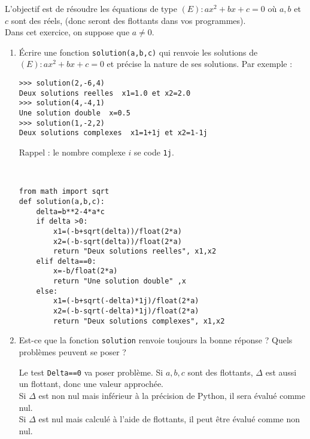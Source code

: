 L'objectif est de r\' esoudre les \' equations de type $(E)\colon ax^2+bx+c=0$ o\` u $a,b$ et $c$ sont des r\' eels, (donc seront des flottants dans vos programmes).\\
Dans cet exercice, on suppose que $a\neq 0$.
\begin{enumerate}
\item \' Ecrire une fonction \verb?solution(a,b,c)? qui renvoie les solutions de $(E)\colon ax^2+bx+c=0$ et pr\' ecise la nature de ses solutions. Par exemple :
\begin{verbatim}
>>> solution(2,-6,4)
Deux solutions reelles  x1=1.0 et x2=2.0
>>> solution(4,-4,1)
Une solution double  x=0.5
>>> solution(1,-2,2)
Deux solutions complexes  x1=1+1j et x2=1-1j
\end{verbatim}
Rappel : le nombre complexe $i$ se code \verb?1j?.

\begin{solution}~\\
\vspace*{-0.7cm}
\begin{verbatim}
from math import sqrt
def solution(a,b,c):
	delta=b**2-4*a*c
	if delta >0:
		x1=(-b+sqrt(delta))/float(2*a)
		x2=(-b-sqrt(delta))/float(2*a)
		return "Deux solutions reelles", x1,x2
	elif delta==0:
		x=-b/float(2*a)
		return "Une solution double" ,x
	else:
		x1=(-b+sqrt(-delta)*1j)/float(2*a)
		x2=(-b-sqrt(-delta)*1j)/float(2*a)
		return "Deux solutions complexes", x1,x2			
\end{verbatim}
\end{solution}
\item Est-ce que la fonction \verb?solution? renvoie toujours la bonne réponse ? Quels problèmes peuvent se poser ?
\begin{solution}
Le test \verb?Delta==0? va poser problème. Si $a,b,c$ sont des flottants, $\Delta$ est aussi un flottant, donc une valeur approchée.\\
Si $\Delta$ est non nul mais inférieur à la précision de Python, il sera évalué comme nul.\\
Si $\Delta$ est nul mais calculé à l'aide de flottants, il peut être évalué comme non nul.
\end{solution}
\end{enumerate}






